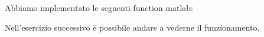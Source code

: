 Abbiamo implementato le seguenti function matlab:


Nell'esercizio successivo è possibile andare a vederne il funzionamento.